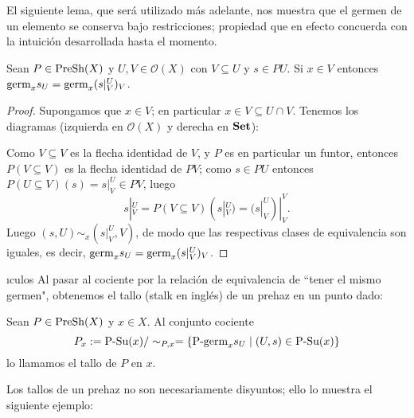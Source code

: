 El siguiente lema, que será utilizado más adelante, nos muestra que el germen de un elemento se conserva bajo restricciones; propiedad que en efecto concuerda con la intuición desarrollada hasta el momento.
\begin{Lema}\label{Lema:LemaAzul}
   Sean $P\in\normalfont{\text{PreSh}}(X)$ y $U,V\in\mathcal{O}(X)$ con $V\subseteq U$ y $s\in PU$. Si $x\in V$ entonces $\normalfont{\text{germ}}_{x}s_{U}=\normalfont{\text{germ}}_{x}(s|^{U}_{V})_{V}$.
\end{Lema}
\begin{proof}
   Supongamos que $x\in V$; en particular $x\in V\subseteq U\cap V$. Tenemos los diagramas (izquierda en $\mathcal{O}(X)$ y derecha en $\normalfont{\textbf{Set}}$):
   
   Como $V\subseteq V$ es la flecha identidad de $V$, y $P$ es en particular un funtor, entonces $P(V\subseteq V)$ es la flecha identidad de $PV$; como $s\in PU$ entonces $P(U\subseteq V)(s)=s|^{U}_{V}\in PV$, luego 
   $$
   s|^{U}_{V}=P(V\subseteq V)(s|^{U}_{V})=(s|^{U}_{V})|^{V}_{V}.
   $$
   Luego $(s,U)\sim_{x}(s|^{U}_{V},V)$, de modo que las respectivas clases de equivalencia son iguales, es decir, $\normalfont{\text{germ}}_{x}s_{U}=\normalfont{\text{germ}}_{x}(s|^{U}_{V})_{V}$.
\end{proof}ıculos
Al pasar al cociente por la relación de equivalencia de ``tener el mismo germen", obtenemos el tallo (stalk en inglés) de un prehaz en un punto dado:
\begin{Def}
   Sean $P\in\normalfont{\text{PreSh}}(X)$ y $x\in X$. Al conjunto cociente
   $$
   P_{x}:=\normalfont{\text{P-Su}}(x)/\sim_{P,x}=\left\lbrace \normalfont{\text{P-germ}}_{x}s_{U}\mid (U,s)\in\normalfont{\text{P-Su}}(x)\right\rbrace
   $$
   lo llamamos el tallo de $P$ en $x$.
\end{Def}
Los tallos de un prehaz no son necesariamente disyuntos; ello lo muestra el siguiente ejemplo:
